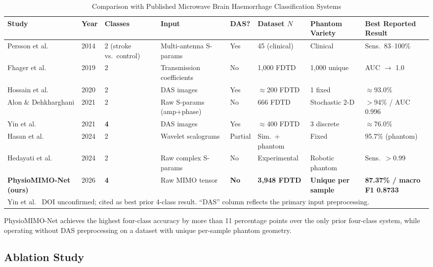 \documentclass[journal]{IEEEtran}
\begin{document}
\begin{table}[!t]
\caption{Comparison with Published Microwave Brain Haemorrhage
  Classification Systems}
\label{tab:sota}
\centering
\begin{tabular}{llllllll}
\toprule
Study & Year & Classes & Input & DAS? & Dataset $N$ &
  Phantom Variety & Best Reported Result \\
\midrule
Persson et al.\ \cite{Persson2014}
  & 2014 & 2 (stroke vs.\ control) & Multi-antenna S-params
  & Yes & 45 (clinical) & Clinical & Sens.\ 83--100\% \\
Fhager et al.\ \cite{Fhager2019}
  & 2019 & 2 & Transmission coefficients
  & No & 1{,}000 FDTD & 1{,}000 unique & AUC $\to$ 1.0 \\
Hossain et al.\ \cite{Hossain2020}
  & 2020 & 2 & DAS images
  & Yes & $\approx$200 FDTD & 1 fixed & $\approx$93.0\% \\
Alon \& Dehkharghani \cite{Alon2021}
  & 2021 & 2 & Raw S-params (amp+phase)
  & No & 666 FDTD & Stochastic 2-D & $>$94\% / AUC 0.996 \\
Yin et al.\ \cite{Yin2021}
  & 2021 & \textbf{4} & DAS images
  & Yes & $\approx$400 FDTD & 3 discrete & $\approx$76.0\% \\
Hasan et al.\ \cite{Hasan2024}
  & 2024 & 2 & Wavelet scalograms
  & Partial & Sim.\ + phantom & Fixed & 95.7\% (phantom) \\
Hedayati et al.\ \cite{Hedayati2024}
  & 2024 & 2 & Raw complex S-params
  & No & Experimental & Robotic phantom & Sens.\ $>$0.99 \\
\midrule
\textbf{PhysioMIMO-Net (ours)}
  & 2026 & \textbf{4} & Raw MIMO tensor
  & \textbf{No} & \textbf{3{,}948 FDTD}
  & \textbf{Unique per sample}
  & \textbf{87.37\% / macro F1 0.8733} \\
\bottomrule
\multicolumn{8}{l}{\footnotesize Yin et al.\ \cite{Yin2021}
  DOI unconfirmed; cited as best prior 4-class result.
  ``DAS'' column reflects the primary input preprocessing.}
\end{tabular}
\end{table}

PhysioMIMO-Net achieves the highest four-class accuracy by
more than 11 percentage points over the only prior four-class
system, while operating without DAS preprocessing on a dataset
with unique per-sample phantom geometry.

\subsection{Ablation Study}
\end{document}
